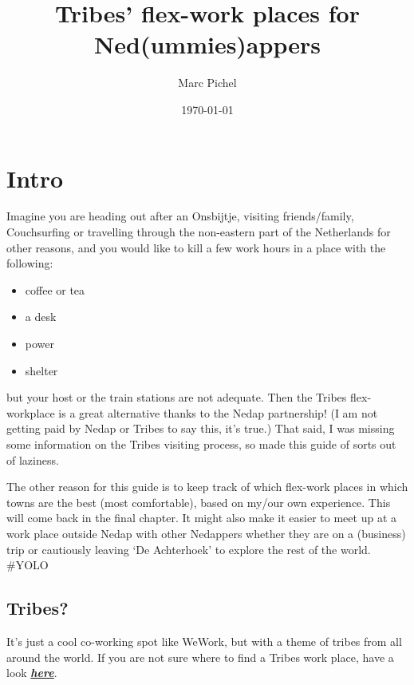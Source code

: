 \documentclass[11pt,a4paper,sans]{report} %
\begin{document}

\title{Tribes' flex-work places for Ned(ummies)appers}
\author{Marc Pichel}
\date{\today}
\maketitle

\tableofcontents

\chapter{Intro}

Imagine you are heading out after an Onsbijtje, visiting friends/family, Couchsurfing or travelling through the non-eastern part of the Netherlands for other reasons, and you would like to kill a few work hours in a place with the following:
\begin{itemize}
	\item coffee or tea 
	\item a desk
	\item power
	\item shelter
\end{itemize}
but your host or the train stations are not adequate. Then the Tribes flex-workplace is a great alternative thanks to the Nedap partnership! (I am not getting paid by Nedap or Tribes to say this, it's true.) That said, I was missing some information on the Tribes visiting process, so made this guide of sorts out of laziness.

The other reason for this guide is to keep track of which flex-work places in which towns are the best (most comfortable), based on my/our own experience. This will come back in the final chapter. It might also make it easier to meet up at a work place outside Nedap with other Nedappers whether they are on a (business) trip or cautiously leaving `De Achterhoek' to explore the rest of the world. \#YOLO

\section{Tribes?}
It's just a cool co-working spot like WeWork, but with a theme of tribes from all around the world. If you are not sure where to find a Tribes work place, have a look \href{https://www.tribes.world/en/locations-listing-simple}{\textbf{\emph{here}}}.
\end{document}

